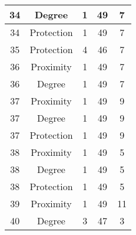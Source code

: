 \documentclass[results.tex]{subfiles}
\begin{document}
\begin{center}
\begin{tabular}{| c || c | c | c | c |}
            \hline
            34                      & Degree                       & 1                      & 49                      & 7                    \\
            \hline
            34                      & Protection                   & 1                      & 49                      & 7                    \\
            \hline
            35                      & Protection                   & 4                      & 46                      & 7                    \\
            \hline
            36                      & Proximity                    & 1                      & 49                      & 7                    \\
            \hline
            36                      & Degree                       & 1                      & 49                      & 7                    \\
            \hline
            37                      & Proximity                    & 1                      & 49                      & 9                    \\
            \hline
            37                      & Degree                       & 1                      & 49                      & 9                    \\
            \hline
            37                      & Protection                   & 1                      & 49                      & 9                    \\
            \hline
            38                      & Proximity                    & 1                      & 49                      & 5                    \\
            \hline
            38                      & Degree                       & 1                      & 49                      & 5                    \\
            \hline
            38                      & Protection                   & 1                      & 49                      & 5                    \\
            \hline
            39                      & Proximity                    & 1                      & 49                      & 11                   \\
            \hline
            40                      & Degree                       & 3                      & 47                      & 3                    \\

\end{tabular}
\end{center}
\end{document}
